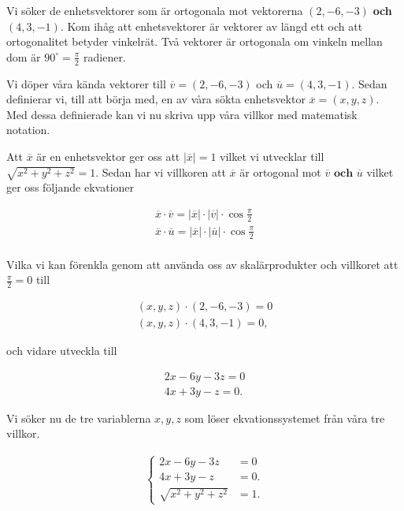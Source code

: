 \documentclass[../../main.tex]{subfiles}
\begin{document}
\begin{solution}{5}

Vi söker de enhetsvektorer som är ortogonala mot vektorerna $(2,-6,-3)$ \textbf{och}  $(4,3,-1)$. Kom ihåg att enhetsvektorer är vektorer av längd ett och att ortogonalitet betyder vinkelrät. Två vektorer är ortogonala om vinkeln mellan dom är $90^\circ=\frac{\pi}{2}$ radiener. 

Vi döper våra kända vektorer till $\overline{v}=(2,-6,-3)$ och $\overline{u}=(4,3,-1)$. Sedan definierar vi, till att börja med, en av våra sökta enhetsvektor $\overline{x}=(x,y,z)$. Med dessa definierade kan vi nu skriva upp våra villkor med matematisk notation. 

\bigskip

Att $\overline{x}$ är en enhetsvektor ger oss att $|\overline{x}|=1$  vilket vi utvecklar till $\sqrt{x^2+y^2+z^2}=1$. 
Sedan har vi villkoren att $\overline{x}$ är ortogonal mot $\overline{v} \textbf{ och } \overline{u}$ vilket ger oss följande ekvationer 

\begin{align*}
    \overline{x}\cdot\overline{v}=|\overline{x}|\cdot|\overline{v}|\cdot\cos{\frac{\pi}{2}} \\
    \overline{x}\cdot\overline{u}=|\overline{x}|\cdot|\overline{u}|\cdot \cos{\frac{\pi}{2}} \\
\end{align*}

Vilka vi kan förenkla genom att använda oss av skalärprodukter och villkoret att $\frac{\pi}{2}=0$ till

\begin{align*}
     (x,y,z)\cdot(2,-6,-3)=0  \\
    (x,y,z)\cdot(4,3,-1)=0,
\end{align*}

och vidare utveckla till

\begin{align*}
     2x-6y-3z=0  \\
    4x+3y-z=0.
\end{align*}

Vi söker nu de tre variablerna $x,y,z$ som löser ekvationssystemet från våra tre villkor.
  
\begin{align*}
    \begin{cases} 
     2x-6y-3z&=0  \\
    4x+3y-z&=0.   \\
    \sqrt{x^2+y^2+z^2}&=1.
    \end{cases}
\end{align*}


\end{solution}
\end{document}
